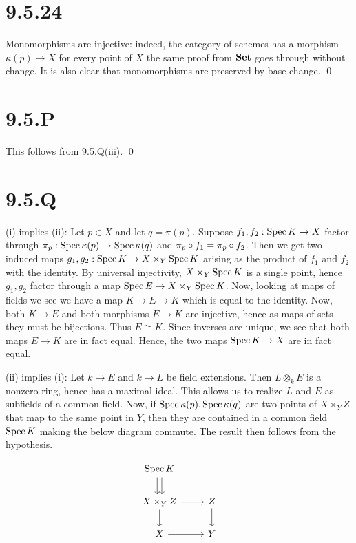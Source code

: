 \documentclass{article}
\begin{document}
\section{9.5.24}
Monomorphisms are injective: indeed, the category of schemes has a morphism
$\kappa(p) \to X$ for every point of $X$ the same
proof from $\mathbf{Set}$ goes through without change. It is also
clear that monomorphisms are preserved by base change. \qed

\section{9.5.P}
This follows from 9.5.Q(iii). \qed

\section{9.5.Q}
 (i) implies (ii): Let $p \in X$ and let
$q=\pi(p)$. Suppose $f_1, f_2: \operatorname{Spec} K \to X$ factor through
$\pi_p:\operatorname{Spec} \kappa(p) \to \operatorname{Spec} \kappa(q)$ and $\pi_p \circ f_1=\pi_p\circ f_2$. Then we get two induced
maps $g_1,g_2: \operatorname{Spec} K \to X \times_Y \operatorname{Spec} K$ arising as the product of $f_1$
and $f_2$ with the identity. By universal injectivity,
$X \times_Y \operatorname{Spec} K$ is a single point, hence $g_1, g_2$ factor
through a map $\operatorname{Spec} E \to X \times_Y \operatorname{Spec} K$. Now, looking at maps of fields we see we
have a map $K \to E \to K$ which is equal to the identity. Now, both
$K \to E$ and both morphisms $E \to K$ are
injective, hence as maps of sets they must be bijections. Thus
$E \cong K$. Since inverses are unique, we see that both maps
$E \to K$ are in fact equal. Hence, the two maps
$\operatorname{Spec} K \to X$ are in fact equal.

(ii) implies (i): Let $k \to E$ and $k \to L$ be
field extensions. Then $L \otimes_k E$ is a nonzero ring, hence has a
maximal ideal. This allows us to realize $L$ and
$E$ as subfields of a common field. Now, if
$\operatorname{Spec} \kappa(p), \operatorname{Spec} \kappa(q)$ are two points of $X \times_Y Z$ that map to
the same point in $Y$, then they are contained in a common
field $\operatorname{Spec} K$ making the below diagram commute. The result then
follows from the hypothesis.

\[\begin{tikzcd}
        {\operatorname{Spec} K} \\{X\times_Y Z} & Z \\
        X & Y
        \arrow[from=2-1, to=3-1]
        \arrow[from=2-1, to=2-2]
        \arrow[from=3-1, to=3-2]
        \arrow[from=2-2, to=3-2]
        \arrow[shift left=1, from=1-1, to=2-1]
        \arrow[shift right=1, from=1-1, to=2-1]
    \end{tikzcd}\]
\end{document}
